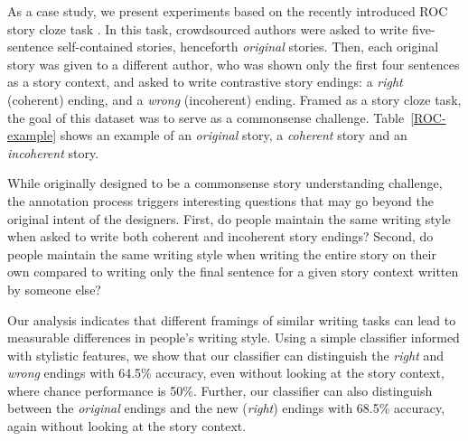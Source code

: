 \documentclass[11pt,a4paper]{article}
\newcommand{\tabref}[1]{Table~\ref{#1}}
\begin{document}
As a case study, we present experiments   based on 
the recently introduced ROC story cloze task \cite{Mostafazadeh:2016}. 
In this task, crowdsourced authors were asked to write five-sentence self-contained stories, henceforth {\it original} stories.
Then, 
each original story was given to a different author, 
who was shown only the first four sentences as a story context, 
and asked to write contrastive story endings: a {\it right} (coherent) ending, and a {\it wrong} (incoherent) ending. 
Framed as a story cloze task, the goal of this dataset was to serve as a commonsense challenge. 
\tabref{ROC-example} shows an example of an {\it original} story, a {\it coherent} story and an {\it incoherent} story.

While originally designed to be 
a commonsense story understanding challenge, 
the annotation process  
triggers interesting questions 
that may go beyond the original intent of the designers.
First, do 
people maintain the same writing 
style when asked to write  
both coherent and incoherent story endings? Second, do people  
maintain the same writing style when writing the entire story on their own compared to 
writing only the final sentence for a given story context written by someone else? 

Our analysis indicates that different framings of similar writing tasks 
can lead to measurable differences in people's writing style.
Using a simple classifier informed with stylistic features, we show that our classifier can distinguish the {\it right} and {\it wrong} endings with 64.5\% accuracy, even without looking at the story context, where chance performance is 50\%.
Further, our classifier can also distinguish between the {\it original} endings and the new ({\it right}) endings with 68.5\% accuracy, again without looking at the story context. 
\end{document}
